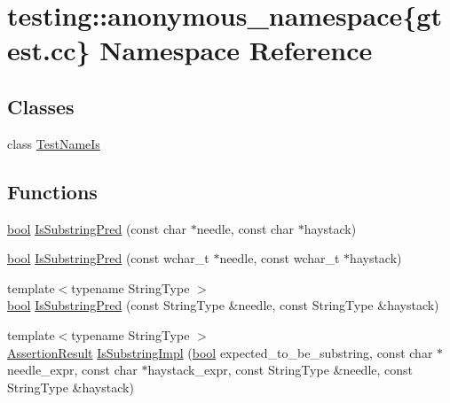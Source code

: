 \hypertarget{namespacetesting_1_1anonymous__namespace_02gtest_8cc_03}{}\section{testing\+:\+:anonymous\+\_\+namespace\{gtest.\+cc\} Namespace Reference}
\label{namespacetesting_1_1anonymous__namespace_02gtest_8cc_03}
\subsection*{Classes}
\begin{DoxyCompactItemize}
\item 
class \hyperlink{classtesting_1_1anonymous__namespace_02gtest_8cc_03_1_1TestNameIs}{Test\+Name\+Is}
\end{DoxyCompactItemize}
\subsection*{Functions}
\begin{DoxyCompactItemize}
\item 
\hyperlink{classbool}{bool} \hyperlink{namespacetesting_1_1anonymous__namespace_02gtest_8cc_03_aa8f2626915e70ad4d628f8fb247e0b6b}{Is\+Substring\+Pred} (const char $\ast$needle, const char $\ast$haystack)
\item 
\hyperlink{classbool}{bool} \hyperlink{namespacetesting_1_1anonymous__namespace_02gtest_8cc_03_ab0b38787cae43f83ad170e8d3260f425}{Is\+Substring\+Pred} (const wchar\+\_\+t $\ast$needle, const wchar\+\_\+t $\ast$haystack)
\item 
{\footnotesize template$<$typename String\+Type $>$ }\\\hyperlink{classbool}{bool} \hyperlink{namespacetesting_1_1anonymous__namespace_02gtest_8cc_03_a529b2b4b07a1d3085fc3ee11f65e6b0c}{Is\+Substring\+Pred} (const String\+Type \&needle, const String\+Type \&haystack)
\item 
{\footnotesize template$<$typename String\+Type $>$ }\\\hyperlink{classtesting_1_1AssertionResult}{Assertion\+Result} \hyperlink{namespacetesting_1_1anonymous__namespace_02gtest_8cc_03_a0e1cb1e2b03a87a9c893322e4caab670}{Is\+Substring\+Impl} (\hyperlink{classbool}{bool} expected\+\_\+to\+\_\+be\+\_\+substring, const char $\ast$needle\+\_\+expr, const char $\ast$haystack\+\_\+expr, const String\+Type \&needle, const String\+Type \&haystack)
\end{DoxyCompactItemize}


